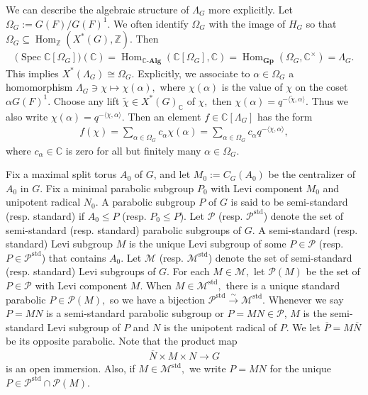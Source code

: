 \documentclass[10pt]{amsart}
\theoremstyle{definition}
\numberwithin{equation}{section}
\DeclareMathOperator{\Hom}{\mathrm{Hom}}
\DeclareMathOperator{\Spec}{\mathrm{Spec}}
\numberwithin{equation}{subsection}
\newcommand{\ZZ}{\mathbb{Z}}
\newcommand{\CC}{\mathbb{C}}
\begin{document}
 We can describe the algebraic structure of $\Lambda_G$ more explicitly. Let $\Omega_G := G(F)/G(F)^1$. We often identify $\Omega_G$ with the image of $H_G$ so that $\Omega_G\subseteq \Hom_{\ZZ}(X^*(G),\ZZ)$. Then
\begin{align*}
    \bigg(\Spec \CC[\Omega_G]\bigg)(\CC) = \Hom_{\CC\textrm{-}\textbf{Alg}}(\CC[\Omega_G],\CC) = \Hom_{\textbf{Gp}}(\Omega_G,\CC^\times) = \Lambda_G.
\end{align*}
This implies $X^*(\Lambda_G) \cong \Omega_G$. Explicitly, we associate to $\alpha\in\Omega_G$ a homomorphism $\Lambda_G\ni\chi\mapsto \chi(\alpha),$ where $\chi(\alpha)$ is the value of $\chi$ on the coset $\alpha G(F)^1$. Choose any lift $\tilde{\chi}\in X^\ast(G)_\CC$ of $\chi,$ then $\chi(\alpha)=q^{-\langle \tilde{\chi},\alpha\rangle}.$ Thus we also write $\chi(\alpha) =q^{-\langle\chi,\alpha\rangle}.$ Then an element $f\in \CC[\Lambda_G]$ has the form
\begin{align}\label{LambdaG:poly:supp}
    f(\chi) = \sum_{\alpha\in \Omega_G} c_\alpha \chi(\alpha) = \sum_{\alpha\in \Omega_G} c_\alpha q^{-\langle\chi,\alpha\rangle},
\end{align}
where $c_\alpha\in \CC$ is zero for all but finitely many $\alpha\in\Omega_G$. 


Fix a maximal split torus $A_0$ of $G$, and let $M_0:=C_G(A_0)$ be the centralizer of $A_0$ in $G$. Fix a minimal parabolic subgroup $P_0$ with Levi component $M_0$ and unipotent radical $N_0$. A parabolic subgroup $P$ of $G$ is said to be semi-standard (resp. standard) if $A_0\le P$ (resp. $P_0\le P$). Let $\mathcal{P}$ (resp. $\mathcal{P}^{\mathrm{std}}$) denote the set of semi-standard (resp. standard) parabolic subgroups of $G$. A semi-standard (resp. standard) Levi
subgroup $M$ is the unique Levi subgroup of some $P\in \mathcal{P}$ (resp. $P\in\mathcal{P}^{\mathrm{std}}$) that contains
$A_0$. Let $\mathcal{M}$ (resp. $\mathcal{M}^{\mathrm{std}}$) denote the set of semi-standard (resp. standard) Levi subgroups of $G$. For each $M\in \mathcal{M},$ let $\mathcal{P}(M)$ be the set of $P\in \mathcal{P}$ with Levi component $M$. When $M\in \mathcal{M}^{\mathrm{std}},$ there is a unique standard parabolic $P\in \mathcal{P}(M),$ so we have a bijection $\mathcal{P}^{\mathrm{std}}\stackrel{\sim}{\longrightarrow} \mathcal{M}^{\mathrm{std}}.$ Whenever we say $P=MN$ is a semi-standard parabolic subgroup or $P=MN\in \mathcal{P}$, $M$ is the semi-standard Levi subgroup of $P$ and $N$ is the unipotent radical of $P$. We let  $\overline{P}=M\overline{N}$ be its opposite parabolic. Note that the product map
\begin{align*}
    \overline{N}\times M\times N\longrightarrow G
\end{align*}
is an open immersion. Also, if $M\in \mathcal{M}^{\mathrm{std}},$ we write $P=MN$ for the unique $P\in \mathcal{P}^{\mathrm{std}}\cap\mathcal{P}(M).$
\end{document}
